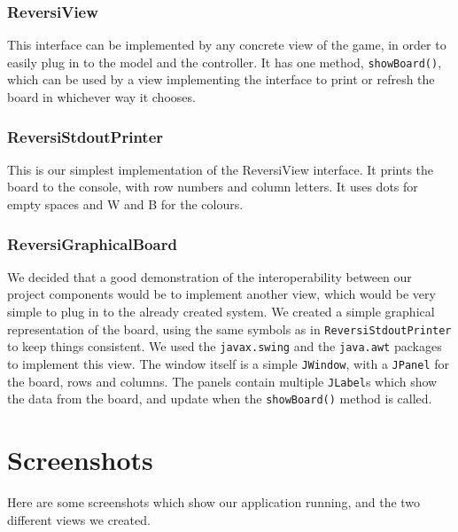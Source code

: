 \documentclass[11pt,a4paper,oneside]{article}
\begin{document}
\subsubsection*{ReversiView}
This interface can be implemented by any concrete view of the game, in order to easily plug in to the model and the controller. It has one method, \texttt{showBoard()}, which can be used by a view implementing the interface to print or refresh the board in whichever way it chooses.

\subsubsection*{ReversiStdoutPrinter}
This is our simplest implementation of the ReversiView interface. It prints the board to the console, with row numbers and column letters. It uses dots for empty spaces and W and B for the colours.

\subsubsection*{ReversiGraphicalBoard}
We decided that a good demonstration of the interoperability between our project components would be to implement another view, which would be very simple to plug in to the already created system. We created a simple graphical representation of the board, using the same symbols as in \texttt{ReversiStdoutPrinter} to keep things consistent. We used the \texttt{javax.swing} and the \texttt{java.awt} packages to implement this view. The window itself is a simple \texttt{JWindow}, with a \texttt{JPanel} for the board, rows and columns. The panels contain multiple \texttt{JLabel}s which show the data from the board, and update when the \texttt{showBoard()} method is called.

\section*{Screenshots}
Here are some screenshots which show our application running, and the two different views we created.\\
\end{document}

